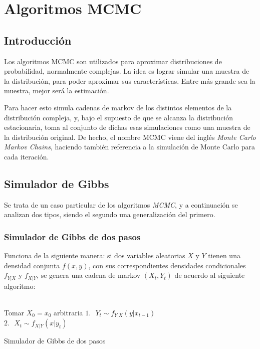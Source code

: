 \chapter[Algoritmos MCMC]{Algoritmos MCMC}\label{chap:MCMC}

\section {Introducci\'on}

Los algoritmos MCMC son utilizados para aproximar distribuciones de probabilidad, normalmente complejas. La idea es lograr simular una muestra de la distribuci\'on, para poder aproximar sus caracter\'isticas. Entre m\'as grande sea la muestra, mejor ser\'a la estimaci\'on.

Para hacer esto simula cadenas de markov de los distintos elementos de la distribuci\'on compleja, y, bajo el supuesto de que se alcanza la distribuci\'on estacionaria, toma al conjunto de dichas esas simulaciones como una muestra de la distribuci\'on original. De hecho, el nombre MCMC viene del ingl\'es \textit{Monte Carlo Markov Chains}, haciendo tambi\'en referencia a la simulaci\'on de Monte Carlo para cada iteraci\'on.

\section{Simulador de Gibbs}

Se trata de un caso particular de los algoritmos \textit{MCMC}, y a continuaci\'on se analizan dos tipos, siendo el segundo una generalizaci\'on del primero.

\subsection{Simulador de Gibbs de dos pasos}

Funciona de la siguiente manera: si dos variables aleatorias $X$ y $Y$ tienen una densidad conjunta $f(x,y)$, con sus correspondientes densidades condicionales $f_{Y|X}$ y $f_{X|Y}$, se genera una cadena de markov $(X_t,Y_t)$ de acuerdo al siguiente algoritmo:
\\ \\
\begin{algorithm}[H]
 {Tomar $X_0 = x_0$ arbitraria \;
     {
        $1. \text{ } Y_t \sim f_{Y|X}(y|x_{t-1})\;$\\
        $2. \text{ } X_t \sim f_{X|Y}(x|y_{t})\;$
     }
 }
 \caption{Simulador de Gibbs de dos pasos}
\end{algorithm}
\BlankLine

